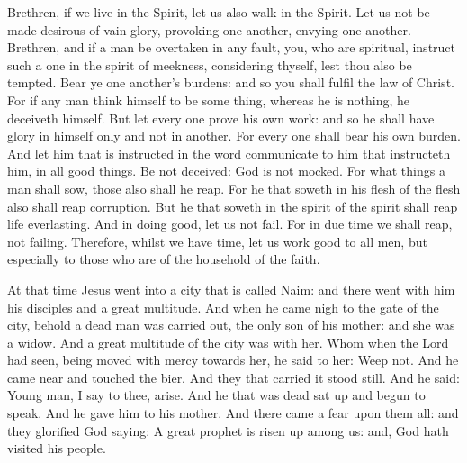 
Brethren, if we live in the Spirit, let us also walk in the Spirit.
Let us not be made desirous of vain glory, provoking one another,
envying one another.
Brethren, and if a man be overtaken in any fault, you, who are
spiritual, instruct such a one in the spirit of meekness, considering
thyself, lest thou also be tempted.
Bear ye one another's burdens: and so you shall fulfil the law of
Christ.
For if any man think himself to be some thing, whereas he is
nothing, he deceiveth himself.
But let every one prove his own work: and so he shall have glory in
himself only and not in another.
For every one shall bear his own burden.
And let him that is instructed in the word communicate to him that
instructeth him, in all good things.
Be not deceived: God is not mocked.
For what things a man shall sow, those also shall he reap.  For he
that soweth in his flesh of the flesh also shall reap corruption. But he
that soweth in the spirit of the spirit shall reap life everlasting.
And in doing good, let us not fail. For in due time we shall reap,
not failing.
Therefore, whilst we have time, let us work good to all men, but
especially to those who are of the household of the faith.



At that time Jesus went into a city that is
called Naim: and there went with him his disciples and a great
multitude.
And when he came nigh to the gate of the city, behold a dead man
was carried out, the only son of his mother: and she was a widow. And a
great multitude of the city was with her.
Whom when the Lord had seen, being moved with mercy towards her,
he said to her: Weep not.
And he came near and touched the bier. And they that carried it
stood still. And he said: Young man, I say to thee, arise.
And he that was dead sat up and begun to speak. And he gave him to
his mother.
And there came a fear upon them all: and they glorified God
saying: A great prophet is risen up among us: and, God hath visited his
people.






